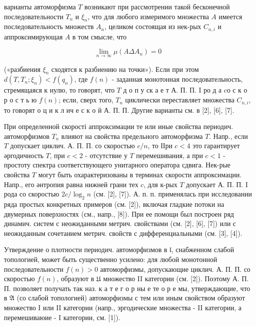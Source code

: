 \documentclass[10pt]{article}
\begin{document}
варианты автоморфизма $T$ возникают при рассмотрении такой бесконечной последовательности $T_{n}$ и $\xi_{n}$, что для любого измеримого множества $A$ имеется последовательность множеств $A_{n}$, целиком состоящая из нек-рых $C_{n, i}$ и аппроксимирующая $A$ в том смысле, что



\[

\lim _{n \rightarrow \infty} \mu\left(A \Delta A_{n}\right)=0

\]



(«разбиения $\xi_{n}$ сходятся к разбиению на точки»). Если при этом $d\left(T, T_{n} ; \xi_{n}\right)<f\left(q_{n}\right)$, где $f(n)$ - заданная монотонная последовательность, стремящаяся к нулю, то говорят, что $T$ д о п у ск а е т А. П. П. I ро д а $\mathrm{c} о$ с к о р о с т ь ю $f(n)$; если, сверх того, $T_{n}$ циклически переставляет множества $C_{n, i}$, то говорят о ц и к л ич е с к о й А. П. П. Другие варианты см. в [2], [6], [7].



При определенной скорості аппроксимации те или иные свойства периодич. автоморфизмов $T_{n}$ влияют на свойства предельного автоморфизма $T$. Напр., если $T$ допускает циклич. А. П. П. со скоростью $c / n$, то ІІри $c<4$ это гарантирует әргодичность $T$, при $c<2$ - отсутствие у $T$ перемешивания, а при $c<1$ - простоту спектра соответствующего унитарного оператора сдвига. Нек-рые свойства $T$ могут быть охарактеризованы в терминах скорости аппроксимации. Напр., его әнтропия равна нижней грани тех $c$, для к-рых $T$ допускает А. П. П. I рода со скоростью $2 c / \log _{2} n$ (см. [2], [7]). А. п. п. применялась при исследовании ряда простых конкретных примеров (см. [2]), включая гладкие потоки на двумерных поверхностях (см., напр., [8]). При ее помощи был построен ряд динамич. систем с неожиданными метрич. свойствами (см. [2], [6], [7]) или с неожиданным сочетанием метрич. свойств с дифференциальными (см. [3], [4]).



Утверждение о плотности периодич. автоморфизмов в $\mathfrak{l}$, снабженном слабой топологией, может быть существенно усилено: для любой монотонной последовательности $f(n)>0$ автоморфизмы, допускающие циклич. А. П. П. со скоростью $f(n)$, образуют в $\mathfrak{U}$ множество II категории (см. [2]). Поэтому А. П. П. позволяет получать так наз. к а т е г о р ны е те о р е мы, утверждающие, что в $\mathfrak{A}$ (со слабой топологией) автоморфизмы с тем или иным свойством образуют множество I или II категории (напр., эргодические множества - II категории, а перемешиваюие - I категории, см. [1]).
\end{document}
